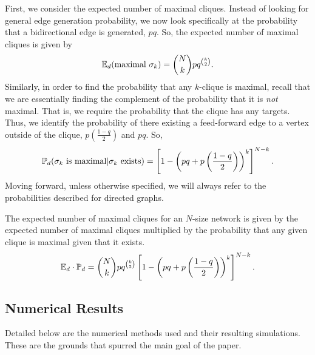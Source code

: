 First, we consider the expected number of maximal cliques. Instead of looking for general edge generation probability, we now look specifically at
the probability that a bidirectional edge is generated, $pq$. So, the expected number of maximal cliques is given by
\begin{align}
    \label{eq:e of max directed}
    \mathbb{E}_d(\mbox{maximal } \sigma_k) = \binom{N}{k}pq^{\binom{k}{2}}.
\end{align}
Similarly, in order to find the probability that any $k$-clique is maximal, recall that we are essentially finding the complement of the probability that it is \textit{not} maximal. That is, we require the probability that the clique has any targets. Thus, we identify the probability of there existing a feed-forward edge to a vertex outside of the clique, $p \left(\frac{1-q}{2} \right)$ and $pq$. So,
\begin{align}
    \label{eq:p max directed}
    \mathbb{P}_d(\sigma_k \mbox{ is maximal}|\sigma_k \mbox{ exists}) = \left[ 1- \left(pq + p   \left(\frac{1-q}{2} \right) \right)^k \right]^{N-k}.
\end{align} 
Moving forward, unless otherwise specified, we will always refer to the probabilities described for directed graphs.

The expected number of maximal cliques for an $N$-size network is given by the expected number of maximal cliques multiplied by the probability that any given clique is maximal given that it exists.
\begin{gather}
    \label{eq:expected max directed}
    \mathbb{E}_d \cdot \mathbb{P}_d = \binom{N}{k}pq^{\binom{k}{2}} \left[ 1- \left(pq + p   \left(\frac{1-q}{2} \right) \right)^k \right]^{N-k}.
\end{gather}

\subsection{Numerical Results}%
\label{sub:Numerical Results}

Detailed below are the numerical methods used and their resulting simulations. These are the grounds that spurred the main goal of the paper.


